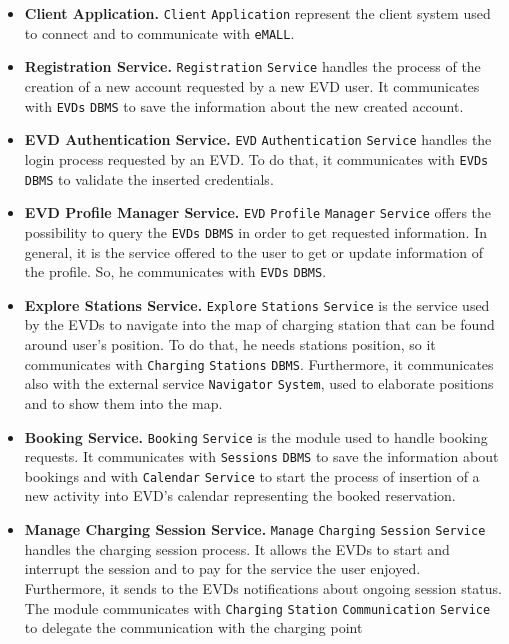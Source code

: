 \begin{itemize}
    \item \textbf{Client Application.} \verb|Client| \verb|Application| represent the client system used to connect and to communicate
    with \verb|eMALL|.
    \item \textbf{Registration Service.} \verb|Registration| \verb|Service| handles the process of the creation
    of a new account requested by a new EVD user.
    It communicates with \verb|EVDs| \verb|DBMS| to save the information about the new created account.
    \item \textbf{EVD Authentication Service.} \verb|EVD| \verb|Authentication| \verb|Service| handles the login process requested by an EVD\@.
    To do that, it communicates with \verb|EVDs| \verb|DBMS| to validate the inserted credentials.
    \item \textbf{EVD Profile Manager Service.} \verb|EVD| \verb|Profile| \verb|Manager| \verb|Service| offers the possibility to query
    the \verb|EVDs| \verb|DBMS| in order to get requested information.
    In general, it is the service offered to the user to get or update information of the profile.
    So, he communicates with \verb|EVDs| \verb|DBMS|.
    \item \textbf{Explore Stations Service.} \verb|Explore| \verb|Stations| \verb|Service| is the service used by the EVDs to navigate
    into the map of charging station that can be found around user's position.
    To do that, he needs stations position, so it communicates with \verb|Charging| \verb|Stations| \verb|DBMS|.
    Furthermore, it communicates also with the external service \verb|Navigator| \verb|System|, used to elaborate positions
    and to show them into the map.
    \item \textbf{Booking Service.} \verb|Booking| \verb|Service| is the module used to handle booking requests.
    It communicates with \verb|Sessions| \verb|DBMS| to save the information about bookings and with \verb|Calendar| \verb|Service|
    to start the process of insertion of a new activity into EVD's calendar representing the booked reservation.
    \item \textbf{Manage Charging Session Service.} \verb|Manage| \verb|Charging| \verb|Session| \verb|Service| handles the charging session process.
    It allows the EVDs to start and interrupt the session and to pay for the service the user enjoyed.
    Furthermore, it sends to the EVDs notifications about ongoing session status.
    The module communicates with \verb|Charging| \verb|Station| \verb|Communication| \verb|Service| to delegate the communication with the charging point

\end{itemize}
